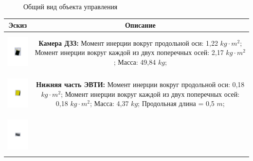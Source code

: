 \begin{figure}[h!]
\caption{Общий вид объекта управления}
\label{control_object_general_view}
\end{figure}

\begin{table}[h!]
\begin{tabular}{|c|c|}
\hline
    Эскиз & Описание                                                                                       \\
\hline
    \includegraphics[height=20mm, keepaspectratio]{./src/pictures/sattelite_3d_images/camera}               &
    \shortstack[l]{\textbf{Камера ДЗЗ:}                                                             \\
                    Момент инерции вокруг продольной оси: 1,22 $kg \cdot m^{2}$;                    \\
                    Момент инерции вокруг каждой из двух поперечных  осей: 2,17 $kg \cdot m^{2}$;   \\
                    Масса: 49,84 $kg$;
                  }                                                                                         \\
\hline
    \includegraphics[height=20mm, keepaspectratio]{./src/pictures/sattelite_3d_images/bottom_shell_part}    &
    \shortstack[l]{\textbf{Нижняя часть ЭВТИ:}                                                      \\
                    Момент инерции вокруг продольной оси: 0,18 $kg \cdot m^{2}$;                    \\
                    Момент инерции вокруг каждой из двух поперечных  осей: 0,18 $kg \cdot m^{2}$;   \\
                    Масса: 4,37 $kg$;                                                               \\
                    Продольная длина = 0,5 $m$;
                  }                                                                                         \\
\hline
    \includegraphics[height=20mm, keepaspectratio]{./src/pictures/sattelite_3d_images/top_shell_part}       &

\end{tabular}
\end{table}
